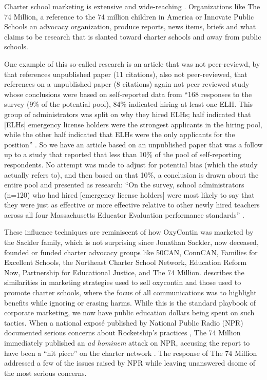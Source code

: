 Charter school marketing is extensive and wide-reaching \parencite{Finalsite2024, CSC2019, Cohen.Lizotte2015}. Organizations like The 74 Million, a reference to the 74 million children in America \parencite{The74Million2024} or Innovate Public Schools \parencite{InnovatePublicSchools2014} an advocacy organization, produce reports, news items, briefs and what claims to be research that is slanted toward charter schools and away from public schools.

One example of this so-called research is an article that was not peer-reviewd,  by \citeauthor{Piper-Vallillo2023} that references unpublished paper \textcite{Bacher-Hicks.etal2023} (11 citations), also not peer-reviewed, that references  on a unpublished paper \textcite{Bacher-Hicks.etal2023a} (8 citations) again not peer reviewed study whose conclusions were based on self-reported data from ``168 responses to the survey (9\% of the potential pool), 84\% indicated hiring at least one ELH. This group of administrators was split on why they hired ELHs; half indicated that [ELHs] emergency license holders were the strongest applicants in the hiring pool, while the other half indicated that ELHs were the only applicants for the position'' \parencite[3]{Bacher-Hicks.etal2023}. So we have an article based on an unpublished paper that was a follow up to a study that reported that less than 10\% of the pool of self-reporting respondents. No attempt was made to adjust for potential bias (which the study actually refers to), and then based on that 10\%, a conclusion is drawn about the entire pool and presented as research: ``On the survey, school administrators (n=120) who had hired [emergency license holders] were most likely to say that they were just as effective or more effective relative to other newly hired teachers across all four Massachusetts Educator Evaluation performance standards'' \parencite[3]{Bacher-Hicks.etal2023}.

These influence techniques are reminiscent of how OxyContin was marketed by the Sackler family, which is not surprising since Jonathan Sackler, now deceased, founded or funded charter advocacy groups like 50CAN, ConnCAN, Families for Excellent Schools, the Northeast Charter School Network, Education Reform Now, Partnership for Educational Justice, and The 74 Million. \textcite{Dubb2017} describes the similarities in marketing strategies used to sell oxycontin and those used to promote charter schools, where the focus of all communications was to highlight benefits while ignoring or erasing harms. While this is the standard playbook of corporate marketing, we now have public education dollars being spent on such tactics. When a national exposé published by National Public Radio (NPR) documented serious concerns about Rocketship's practices \parencite{Kamenetz2016}, The 74 Million immediately published an \textit{ad hominem} attack on NPR, accusing the report to have been a ``hit piece'' on the charter network \parencite{Smith2016a}. The response of The 74 Million addressed a few of the issues raised by NPR 
while leaving unanswered dsome of the most serious concerns.

